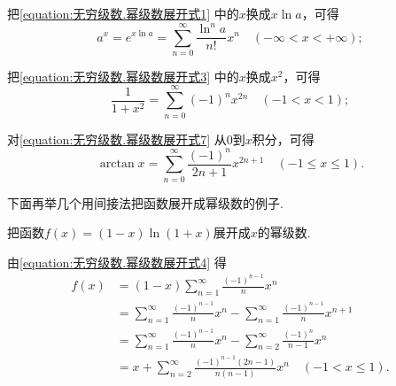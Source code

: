 把\cref{equation:无穷级数.幂级数展开式1} 中的\(x\)换成\(x \ln a\)，可得
\begin{equation}\label{equation:无穷级数.幂级数展开式6}
a^x = e^{x \ln a} = \sum\limits_{n=0}^\infty \frac{\ln^n a}{n!} x^n
\quad(-\infty<x<+\infty);
\end{equation}

把\cref{equation:无穷级数.幂级数展开式3} 中的\(x\)换成\(x^2\)，可得
\begin{equation}\label{equation:无穷级数.幂级数展开式7}
\frac{1}{1+x^2} = \sum\limits_{n=0}^\infty (-1)^n x^{2n}
\quad(-1<x<1);
\end{equation}

对\cref{equation:无穷级数.幂级数展开式7} 从\(0\)到\(x\)积分，可得
\begin{equation}
\arctan x = \sum\limits_{n=0}^\infty \frac{(-1)^n}{2n+1} x^{2n+1}
\quad(-1 \leqslant x \leqslant 1).
\end{equation}

下面再举几个用间接法把函数展开成幂级数的例子.

\begin{example}
把函数\(f(x) = (1-x) \ln(1+x)\)展开成\(x\)的幂级数.
\begin{solution}
由\cref{equation:无穷级数.幂级数展开式4} 得\[
\begin{split}
f(x) &= (1-x) \sum\limits_{n=1}^\infty \frac{(-1)^{n-1}}{n} x^n \\
&= \sum\limits_{n=1}^\infty \frac{(-1)^{n-1}}{n} x^n
	- \sum\limits_{n=1}^\infty \frac{(-1)^{n-1}}{n} x^{n+1} \\
&= \sum\limits_{n=1}^\infty \frac{(-1)^{n-1}}{n} x^n
	- \sum\limits_{n=2}^\infty \frac{(-1)^n}{n-1} x^n \\
&= x + \sum\limits_{n=2}^\infty \frac{(-1)^{n-1} (2n-1)}{n(n-1)} x^n
\quad(-1 < x \leqslant 1).
\end{split}
\]
\end{solution}
\end{example}

